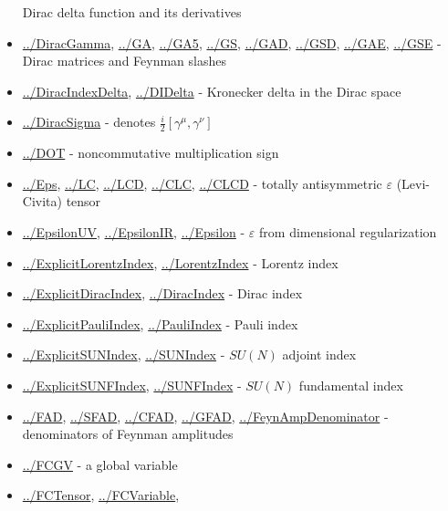 \documentclass[../FeynCalcManual.tex]{subfiles}
\begin{document}
\begin{itemize}
  Dirac delta function and its derivatives
\item
  \hyperlink{../diracgamma}{../DiracGamma}, \hyperlink{../ga}{../GA},
  \hyperlink{../ga5}{../GA5}, \hyperlink{../gs}{../GS},
  \hyperlink{../gad}{../GAD}, \hyperlink{../gsd}{../GSD},
  \hyperlink{../gae}{../GAE}, \hyperlink{../gse}{../GSE} - Dirac
  matrices and Feynman slashes
\item
  \hyperlink{../diracindexdelta}{../DiracIndexDelta},
  \hyperlink{../didelta}{../DIDelta} - Kronecker delta in the Dirac
  space
\item
  \hyperlink{../diracsigma}{../DiracSigma} - denotes
  \(\frac{i}{2}[\gamma^\mu, \gamma^\nu]\)
\item
  \hyperlink{../dot}{../DOT} - noncommutative multiplication sign
\item
  \hyperlink{../eps}{../Eps}, \hyperlink{../lc}{../LC},
  \hyperlink{../lcd}{../LCD}, \hyperlink{../clc}{../CLC},
  \hyperlink{../clcd}{../CLCD} - totally antisymmetric \(\varepsilon\)
  (Levi-Civita) tensor
\item
  \hyperlink{../epsilonuv}{../EpsilonUV},
  \hyperlink{../epsilonir}{../EpsilonIR},
  \hyperlink{../epsilon}{../Epsilon} - \(\varepsilon\) from dimensional
  regularization
\item
  \hyperlink{../explicitlorentzindex}{../ExplicitLorentzIndex},
  \hyperlink{../lorentzindex}{../LorentzIndex} - Lorentz index
\item
  \hyperlink{../explicitdiracindex}{../ExplicitDiracIndex},
  \hyperlink{../diracindex}{../DiracIndex} - Dirac index
\item
  \hyperlink{../explicitpauliindex}{../ExplicitPauliIndex},
  \hyperlink{../pauliindex}{../PauliIndex} - Pauli index
\item
  \hyperlink{../explicitsunindex}{../ExplicitSUNIndex},
  \hyperlink{../sunindex}{../SUNIndex} - \(SU(N)\) adjoint index
\item
  \hyperlink{../explicitsunfindex}{../ExplicitSUNFIndex},
  \hyperlink{../sunfindex}{../SUNFIndex} - \(SU(N)\) fundamental index
\item
  \hyperlink{../fad}{../FAD}, \hyperlink{../sfad}{../SFAD},
  \hyperlink{../cfad}{../CFAD}, \hyperlink{../gfad}{../GFAD},
  \hyperlink{../feynampdenominator}{../FeynAmpDenominator} -
  denominators of Feynman amplitudes
\item
  \hyperlink{../fcgv}{../FCGV} - a global variable
\item
  \hyperlink{../fctensor}{../FCTensor},
  \hyperlink{../fcvariable}{../FCVariable},

\end{itemize}
\end{document}
